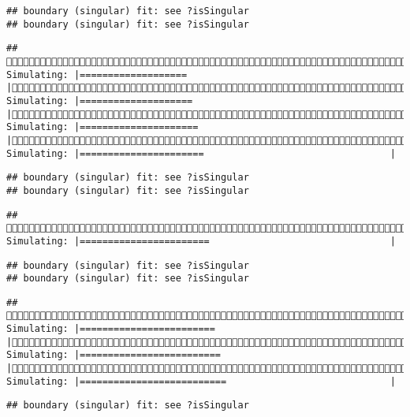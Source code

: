 \documentclass[]{article}
\begin{document}
\begin{verbatim}
## boundary (singular) fit: see ?isSingular
## boundary (singular) fit: see ?isSingular
\end{verbatim}

\begin{verbatim}
## (1/4) Simulating: |===================                                    |(1/4) Simulating: |====================                                   |(1/4) Simulating: |=====================                                  |(1/4) Simulating: |======================                                 |
\end{verbatim}

\begin{verbatim}
## boundary (singular) fit: see ?isSingular
## boundary (singular) fit: see ?isSingular
\end{verbatim}

\begin{verbatim}
## (1/4) Simulating: |=======================                                |
\end{verbatim}

\begin{verbatim}
## boundary (singular) fit: see ?isSingular
## boundary (singular) fit: see ?isSingular
\end{verbatim}

\begin{verbatim}
## (1/4) Simulating: |========================                               |(1/4) Simulating: |=========================                              |(1/4) Simulating: |==========================                             |
\end{verbatim}

\begin{verbatim}
## boundary (singular) fit: see ?isSingular
\end{verbatim}
\end{document}

